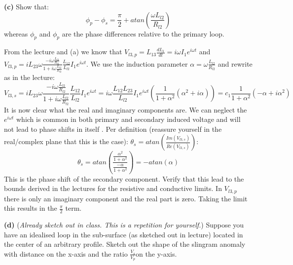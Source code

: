 \textbf{(c)} Show that:
$$
\phi_p - \phi_s = \frac{\pi}{2} + atan(\frac{\omega L_{l2}}{R_{l2}})
$$
whereas $\phi_p$ and $\phi_p$ are the phase differences relative to the primary loop.
\ifanswers
    \begin{tcolorbox}[enhanced jigsaw,breakable,pad at break*=1mm,
    colback=blue!5!white,colframe=babyblueeyes,title=Solutions,
    watermark color=white]
     From the lecture and (a) we know that $V_{l3,p} = L_{13}\frac{dI_{l1}}{dt} = i\omega I_1 e^{i\omega t}$ and $V_{l3,p} = iL_{23}\omega \frac{-i\omega \frac{L_{l2}}{R_{l2}}}{1+i\omega \frac{L_{l2}}{R_{l2}}}\frac{L_{12}}{L_{l2}}I_1e^{i\omega t}$. We use the induction parameter $\alpha = \omega\frac{L_{l2}}{R_{l2}}$ and rewrite as in the lecture:
     $$
     V_{l3,s} = iL_{23}\omega \frac{-i\omega \frac{L_{l2}}{R_{l2}}}{1+i\omega \frac{L_{l2}}{R_{l2}}}\frac{L_{12}}{L_{l2}}I_1e^{i\omega t} = i\omega\frac{L_{12}L_{23}}{L_{l2}}I_1e^{i\omega t} \left(\frac{1}{1+\alpha^2}(\alpha^2+i\alpha)\right) = c_1 \frac{1}{1+\alpha^2}(-\alpha+i\alpha^2)
     $$
     It is now clear what the real and imaginary components are. We can neglect the $e^{i\omega t}$ which is common in both primary and secondary induced voltage and will not lead to phase shifts in itself . Per definition (reassure yourself in the real/complex plane that this is the case): $\theta_s = atan(\frac{Im(V_{l3,s})}{Re(V_{l3,s})})$:
     $$
     \theta_s = atan\left(\frac{\frac{\alpha^2}{1+\alpha^2}}{\frac{-\alpha}{1+\alpha^2}} \right) = -atan(\alpha)
     $$
     This is the phase shift of the secondary component. Verify that this lead to the bounds derived in the lectures for the resistive and conductive limits. In $V_{l3,p}$ there is only an imaginary component and the real part is zero. Taking the limit  this results in the $\frac{\pi}{2}$ term.
\end{tcolorbox}
\fi
\textbf{(d)} (\textit{Already sketch out in class. This is a repetition for yourself.}) Suppose you have an idealised loop in the sub-surface (as sketched out in lecture) located in the center of an arbitrary profile. Sketch out the shape of the slingram anomaly with distance on the x-axis and the ratio $\frac{V_s}{V_p}$on the y-axis.
\ifanswers
